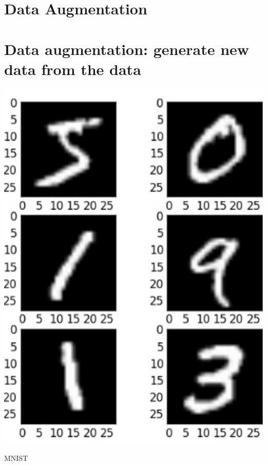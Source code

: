 \documentclass[10pt]{article}
\begin{document}
\section*{Data Augmentation}
\section*{Data augmentation: generate new data from the data}
\begin{center}
\includegraphics[max width=\textwidth]{2024_01_08_959e2db67a31f073f6d2g-23(2)}
\end{center}

MNIST
\end{document}
